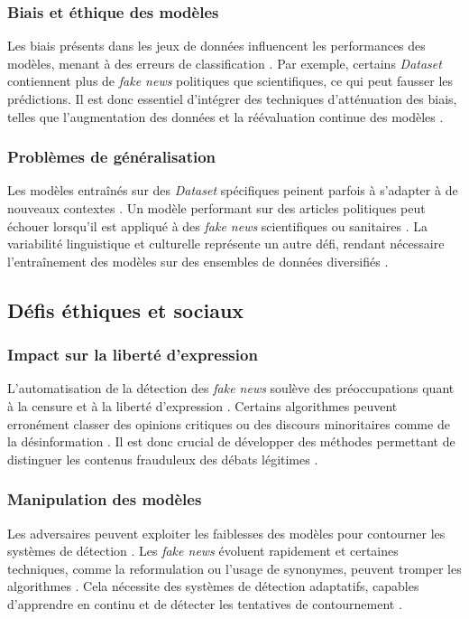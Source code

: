 \documentclass[a4paper,12pt, twocolumn]{article}
\begin{document}
\begin{twocolumn}
\subsubsection{Biais et éthique des modèles}
Les biais présents dans les jeux de données influencent les performances des modèles, menant à des erreurs de classification \cite{truica_its_2023}. Par exemple, certains \textit{Dataset} contiennent plus de \textit{fake news} politiques que scientifiques, ce qui peut fausser les prédictions. Il est donc essentiel d’intégrer des techniques d’atténuation des biais, telles que l’augmentation des données et la réévaluation continue des modèles \cite{verma_welfake_2021}.

\subsubsection{Problèmes de généralisation}
Les modèles entraînés sur des \textit{Dataset} spécifiques peinent parfois à s’adapter à de nouveaux contextes \cite{roumeliotis_fake_2025}. Un modèle performant sur des articles politiques peut échouer lorsqu'il est appliqué à des \textit{fake news} scientifiques ou sanitaires \cite{alghamdi_towards_2023}. La variabilité linguistique et culturelle représente un autre défi, rendant nécessaire l’entraînement des modèles sur des ensembles de données diversifiés \cite{hu_bad_2024}.


\subsection{Défis éthiques et sociaux}

\subsubsection{Impact sur la liberté d'expression}
L’automatisation de la détection des \textit{fake news} soulève des préoccupations quant à la censure et à la liberté d'expression \cite{hu_bad_2024}. Certains algorithmes peuvent erronément classer des opinions critiques ou des discours minoritaires comme de la désinformation \cite{roumeliotis_fake_2025}. Il est donc crucial de développer des méthodes permettant de distinguer les contenus frauduleux des débats légitimes \cite{hu_bad_2024}.


\subsubsection{Manipulation des modèles}
Les adversaires peuvent exploiter les faiblesses des modèles pour contourner les systèmes de détection \cite{hu_bad_2024}. Les \textit{fake news} évoluent rapidement et certaines techniques, comme la reformulation ou l’usage de synonymes, peuvent tromper les algorithmes \cite{roumeliotis_fake_2025}. Cela nécessite des systèmes de détection adaptatifs, capables d’apprendre en continu et de détecter les tentatives de contournement \cite{hu_bad_2024}.


\end{twocolumn}
\end{document}

